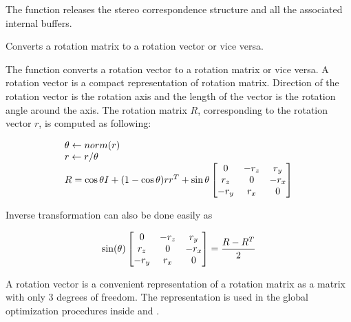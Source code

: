 \begin{description}
\end{description}

The function releases the stereo correspondence structure and all the associated internal buffers. 


Converts a rotation matrix to a rotation vector or vice versa.


\begin{description}
\end{description}

The function converts a rotation vector to a rotation matrix or vice versa. A rotation vector is a compact representation of rotation matrix. Direction of the rotation vector is the rotation axis and the length of the vector is the rotation angle around the axis. The rotation matrix $R$, corresponding to the rotation vector $r$, is computed as following:

\[
\begin{array}{l}
\theta \leftarrow norm(r)\\
r \leftarrow r/\theta\\
R = \cos{\theta} I + (1-\cos{\theta}) r r^T + \sin{\theta}
\begin{bmatrix} 0 & -r_z & r_y\\ r_z & 0 & -r_x\\ -r_y & r_x & 0 \end{bmatrix}
\end{array}
\]

Inverse transformation can also be done easily as

\[
\sin(\theta)
\begin{bmatrix} 0 & -r_z & r_y\\ r_z & 0 & -r_x\\ -r_y & r_x & 0 \end{bmatrix}
=
\frac{R - R^T}{2}
\]

A rotation vector is a convenient representation of a rotation matrix
as a matrix with only 3 degrees of freedom. The representation is
used in the global optimization procedures inside
and .



